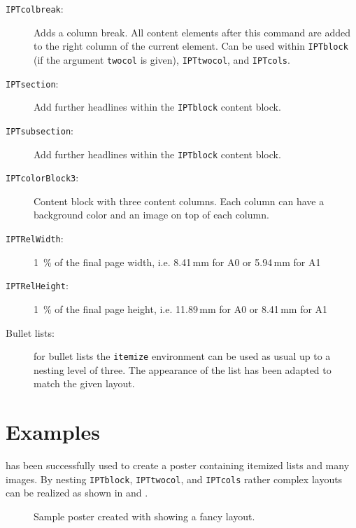 \begin{description}
	\item[\texttt{\bs{}IPTcolbreak}:] Adds a column break. All content elements after this command are added to the right column of the current element. Can be used within \texttt{IPTblock} (if the argument \texttt{twocol} is given), \texttt{IPTtwocol}, and \texttt{IPTcols}.

	\item[\texttt{\bs{}IPTsection}:] Add further headlines within the \texttt{\bs{}IPTblock} content block.

	\item[\texttt{\bs{}IPTsubsection}:] Add further headlines within the \texttt{\bs{}IPTblock} content block.

	\item[\texttt{IPTcolorBlock3}:] Content block with three content columns. Each column can have a background color and an image on top of each column.

	\item[\texttt{IPTRelWidth}:] 1~\% of the final page width, i.e. 8.41\,mm for A0 or 5.94\,mm for A1

	\item[\texttt{IPTRelHeight}:] 1~\% of the final page height, i.e. 11.89\,mm for A0 or 8.41\,mm for A1

	\item[Bullet lists:] for bullet lists the \texttt{itemize} environment can be used as usual up to a nesting level of three. The appearance of the list has been adapted to match the given layout.

\end{description}


\section{Examples}

\tugPoster{} has been successfully used to create a poster containing itemized lists and many images. By nesting \texttt{IPTblock}, \texttt{IPTtwocol}, and \texttt{IPTcols} rather complex layouts can be realized as shown in  and .

\begin{figure}
\centering
\caption{Sample poster created with \tugPoster{} showing a fancy layout.}
\label{fig:sample_poster1}
\end{figure}

